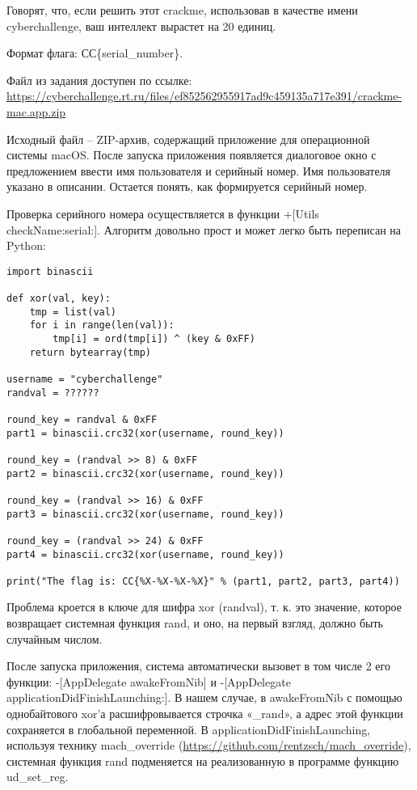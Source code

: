
Говорят, что, если решить этот crackme, использовав в качестве имени cyberchallenge, ваш интеллект вырастет на 20 единиц.

Формат флага: СС\{serial\_number\}.

Файл из задания доступен по ссылке: \url{
https://cyberchallenge.rt.ru/files/ef852562955917ad9c459135a717e391/crackme-mac.app.zip}

\solutionSection

Исходный файл – ZIP-архив, содержащий приложение для операционной системы macOS. После запуска приложения появляется диалоговое окно с предложением ввести имя пользователя и серийный номер. Имя пользователя указано в описании. Остается понять, как формируется серийный номер.

Проверка серийного номера осуществляется в функции +[Utils checkName:serial:]. Алгоритм довольно прост и может легко быть переписан на Python:

\begin{verbatim}
import binascii

def xor(val, key):
    tmp = list(val)
    for i in range(len(val)):
        tmp[i] = ord(tmp[i]) ^ (key & 0xFF)
    return bytearray(tmp)

username = "cyberchallenge"
randval = ??????

round_key = randval & 0xFF
part1 = binascii.crc32(xor(username, round_key))

round_key = (randval >> 8) & 0xFF
part2 = binascii.crc32(xor(username, round_key))

round_key = (randval >> 16) & 0xFF
part3 = binascii.crc32(xor(username, round_key))

round_key = (randval >> 24) & 0xFF
part4 = binascii.crc32(xor(username, round_key))

print("The flag is: CC{%X-%X-%X-%X}" % (part1, part2, part3, part4))
\end{verbatim}

Проблема кроется в ключе для шифра xor (randval), т. к. это значение, которое возвращает системная функция rand, и оно, на первый взгляд, должно быть случайным числом.


После запуска приложения, система автоматически вызовет в том числе 2 его функции: -[AppDelegate awakeFromNib] и -[AppDelegate applicationDidFinishLaunching:]. В нашем случае, в awakeFromNib с помощью однобайтового xor’а расшифровывается строчка «\_rand», а адрес этой функции сохраняется в глобальной переменной. В applicationDidFinishLaunching, используя технику mach\_override (\url{https://github.com/rentzsch/mach_override}), системная функция rand подменяется на реализованную в программе функцию ud\_set\_reg.

